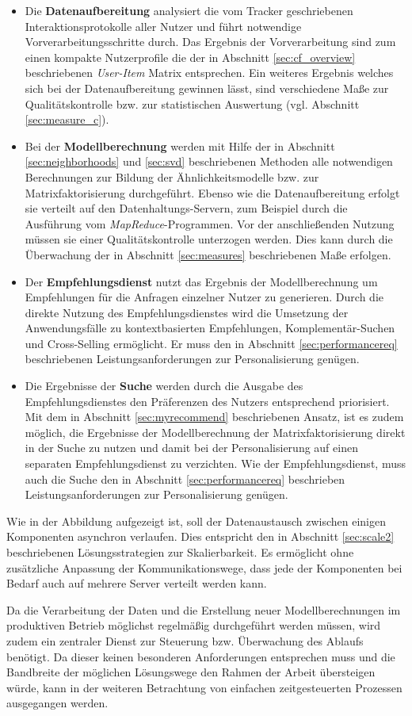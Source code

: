 \begin{itemize}
\item Die \textbf{Datenaufbereitung} analysiert die vom Tracker geschriebenen Interaktionsprotokolle aller Nutzer und führt notwendige Vorverarbeitungsschritte durch. Das Ergebnis der Vorverarbeitung sind zum einen kompakte Nutzerprofile die der in Abschnitt \ref{sec:cf_overview} beschriebenen \textit{User-Item} Matrix entsprechen. Ein weiteres Ergebnis welches sich bei der Datenaufbereitung gewinnen lässt, sind verschiedene Maße zur Qualitätskontrolle bzw. zur statistischen Auswertung (vgl. Abschnitt \ref{sec:measure_c}).
\item Bei der \textbf{Modellberechnung} werden mit Hilfe der in Abschnitt \ref{sec:neighborhoods} und \ref{sec:svd} beschriebenen Methoden alle notwendigen Berechnungen zur Bildung der Ähnlichkeitsmodelle bzw. zur Matrixfaktorisierung durchgeführt. Ebenso wie die Datenaufbereitung erfolgt sie verteilt auf den Datenhaltungs-Servern, zum Beispiel durch die Ausführung vom \textit{MapReduce}-Programmen. Vor der anschließenden Nutzung müssen sie einer Qualitätskontrolle unterzogen werden. Dies kann durch die Überwachung der in Abschnitt \ref{sec:measures} beschriebenen Maße erfolgen.
\item Der \textbf{Empfehlungsdienst} nutzt das Ergebnis der Modellberechnung um Empfehlungen für die Anfragen einzelner Nutzer zu generieren. Durch die direkte Nutzung des Empfehlungsdienstes wird die Umsetzung der Anwendungsfälle zu kontextbasierten Empfehlungen, Komplementär-Suchen und Cross-Selling ermöglicht.  Er muss den in Abschnitt \ref{sec:performancereq} beschriebenen Leistungsanforderungen zur Personalisierung genügen.
\item Die Ergebnisse der \textbf{Suche} werden durch die Ausgabe des Empfehlungsdienstes den Präferenzen des Nutzers entsprechend priorisiert. Mit dem in Abschnitt \ref{sec:myrecommend} beschriebenen Ansatz, ist es zudem möglich, die Ergebnisse der Modellberechnung der Matrixfaktorisierung direkt in der Suche zu nutzen und damit bei der Personalisierung auf einen separaten Empfehlungsdienst zu verzichten. Wie der Empfehlungsdienst, muss auch die Suche den in Abschnitt \ref{sec:performancereq} beschrieben Leistungsanforderungen zur Personalisierung genügen.
\end{itemize}

Wie in der Abbildung aufgezeigt ist, soll der Datenaustausch zwischen einigen Komponenten asynchron verlaufen. Dies entspricht den in Abschnitt \ref{sec:scale2} beschriebenen Lösungsstrategien zur Skalierbarkeit. Es ermöglicht ohne zusätzliche Anpassung der Kommunikationswege, dass jede der Komponenten bei Bedarf auch auf mehrere Server verteilt werden kann.

Da die Verarbeitung der Daten und die Erstellung neuer Modellberechnungen im produktiven Betrieb möglichst regelmäßig durchgeführt werden müssen, wird zudem ein zentraler Dienst zur Steuerung bzw. Überwachung des Ablaufs benötigt. Da dieser keinen besonderen Anforderungen entsprechen muss und die Bandbreite der möglichen Lösungswege den Rahmen der Arbeit übersteigen würde, kann in der weiteren Betrachtung von einfachen zeitgesteuerten Prozessen ausgegangen werden. 
